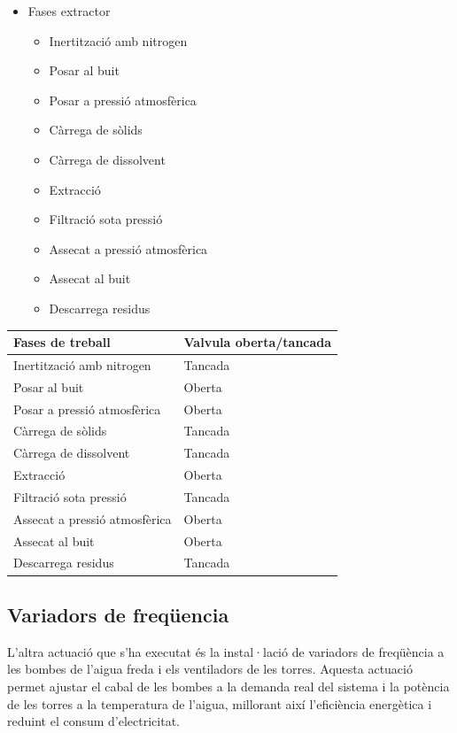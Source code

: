 \documentclass[
  paper=a4,
  oneside  ,captions=tableheading
]{scrartcl}
\newcounter{none}
\providecommand{\tightlist}{%
  \setlength{\itemsep}{0pt}\setlength{\parskip}{0pt}}
\begin{document}
\begin{itemize}
\tightlist
\item
  Fases extractor

  \begin{itemize}
  \tightlist
  \item
    Inertització amb nitrogen
  \item
    Posar al buit
  \item
    Posar a pressió atmosfèrica
  \item
    Càrrega de sòlids
  \item
    Càrrega de dissolvent
  \item
    Extracció
  \item
    Filtració sota pressió
  \item
    Assecat a pressió atmosfèrica
  \item
    Assecat al buit
  \item
    Descarrega residus
  \end{itemize}
\end{itemize}

{\def\LTcaptype{none} %
\begin{longtable}[]{@{}ll@{}}
\toprule\noalign{}
Fases de treball & Valvula oberta/tancada \\
\midrule\noalign{}
\endhead
\bottomrule\noalign{}
\endlastfoot
Inertització amb nitrogen & Tancada \\
Posar al buit & Oberta \\
Posar a pressió atmosfèrica & Oberta \\
Càrrega de sòlids & Tancada \\
Càrrega de dissolvent & Tancada \\
Extracció & Oberta \\
Filtració sota pressió & Tancada \\
Assecat a pressió atmosfèrica & Oberta \\
Assecat al buit & Oberta \\
Descarrega residus & Tancada \\
\end{longtable}
}

\subsection{Variadors de freqüencia}\label{variadors-de-frequxfcencia}

L'altra actuació que s'ha executat és la instal·lació de variadors de
freqüència a les bombes de l'aigua freda i els ventiladors de les
torres. Aquesta actuació permet ajustar el cabal de les bombes a la
demanda real del sistema i la potència de les torres a la temperatura de
l'aigua, millorant així l'eficiència energètica i reduint el consum
d'electricitat.
\end{document}
